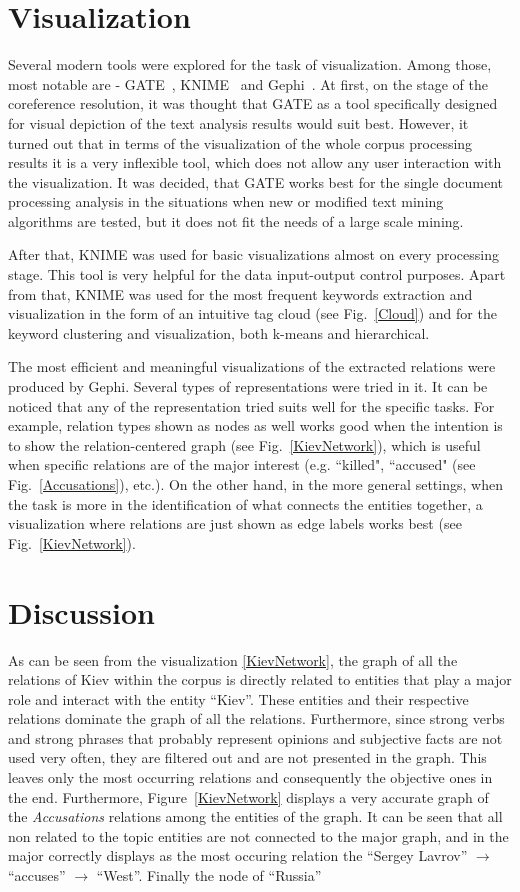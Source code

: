 \documentclass[]{article}
\begin{document}
\section{Visualization}
%
Several modern tools were explored for the task of visualization. Among those, most notable are - GATE~\cite{gate}, KNIME~\cite{knime} and Gephi~\cite{gephi}. At first, on the stage of the coreference resolution, it was thought that GATE as a tool specifically designed for visual depiction of the text analysis results would suit best. However, it turned out that in terms of the visualization of the whole corpus processing results it is a very inflexible tool, which does not allow any user interaction with the visualization. It was decided, that GATE works best for the single document processing analysis in the situations when new or modified text mining algorithms are tested, but it does not fit the needs of a large scale mining.

After that, KNIME was used for basic visualizations almost on every processing stage. This tool is very helpful for the data input-output control purposes. Apart from that, KNIME was used for the most frequent keywords extraction and visualization in the form of an intuitive tag cloud (see Fig.~\ref{Cloud}) and for the keyword clustering and visualization, both k-means and hierarchical.

The most efficient and meaningful visualizations of the extracted relations were produced by Gephi. Several types of representations were tried in it. It can be noticed that any of the representation tried suits well for the specific tasks. For example, relation types shown as nodes as well works good when the intention is to show the relation-centered graph (see Fig.~\ref{KievNetwork}), which is useful when specific relations are of the major interest (e.g. ``killed", ``accused" (see Fig.~\ref{Accusations}), etc.). On the other hand, in the more general settings, when the task is more in the identification of what connects the entities together, a visualization where relations are just shown as edge labels works best (see Fig.~\ref{KievNetwork}).

% 
\section{Discussion}
%
As can be seen from the visualization \ref{KievNetwork}, the graph of all the relations of Kiev within the corpus is directly related to entities that play a major role and interact with the entity ``Kiev''. These entities and their respective relations dominate the graph of all the relations. Furthermore, since strong verbs and strong phrases that probably represent opinions and subjective facts are not used very often, they are filtered out and are not presented in the graph. This leaves only the most occurring relations and consequently the objective ones in the end. Furthermore, Figure~\ref{KievNetwork} displays a very accurate graph of the \textit{Accusations} relations among the entities of the graph. It can be seen that all non related to the topic entities are not connected to the major graph, and in the major correctly displays as the most occuring relation the ``Sergey Lavrov'' $\to$ ``accuses'' $\to$  ``West''. Finally the node of ``Russia''
\end{document}
